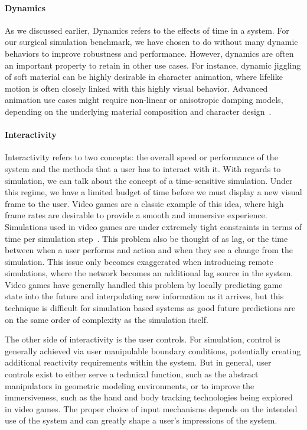 \paragraph{Dynamics} As we discussed earlier, Dynamics refers to the
  effects of time in a system. For our surgical simulation benchmark,
  we have chosen to do without many dynamic behaviors to improve
  robustness and performance. However, dynamics are often an important
  property to retain in other use cases. For instance, dynamic
  jiggling of soft material can be highly desirable in character
  animation, where lifelike motion is often closely linked with this
  highly visual behavior. Advanced animation use cases might require
  non-linear or anisotropic damping models, depending on the
  underlying material composition and character design~\citep{Xu:2017:EBD}.



  

\paragraph{Interactivity} Interactivity refers to two concepts: the overall
  speed or performance of the system and the methods that a user has
  to interact with it. With regards to simulation, we can talk about
  the concept of a time-sensitive simulation. Under this regime, we
  have a limited budget of time before we must display a new visual
  frame to the user. Video games are a classic example of this idea,
  where high frame rates are desirable to provide a smooth and
  immersive experience. Simulations used in video games are under
  extremely tight constraints in terms of time per simulation
  step~\citep{ParkeO:2009}. This problem also be thought of as lag, or
  the time between when a user performs and action and when they see a
  change from the simulation. This issue only becomes exaggerated when
  introducing remote simulations, where the network becomes an
  additional lag source in the system. Video games have generally
  handled this problem by locally predicting game state into the
  future and interpolating new information as it arrives, but this
  technique is difficult for simulation based systems as good future
  predictions are on the same order of complexity as the simulation itself.

  The other side of interactivity is the user controls. For
  simulation, control is generally achieved via user manipulable
  boundary conditions, potentially creating additional reactivity
  requirements within the system. But in general, user controls exist
  to either serve a technical function, such as the abstract
  manipulators in geometric modeling environments, or to improve the
  immersiveness, such as the hand and body tracking technologies being
  explored in video games. The proper choice of input mechanisms
  depends on the intended use of the system and can greatly shape a
  user's impressions of the system.

